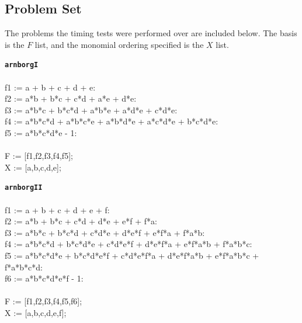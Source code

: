 \documentclass[letterpaper,12pt,titlepage,oneside,final]{book}
\newenvironment{codefont}{\footnotesize\ttfamily}{\par}
\begin{document}
\begin{appendices}
% 


\chapter{Problem Set}\label{probSet}

The problems the timing tests were performed over are included below.  The basis is the $F$ list, and the monomial ordering specified is the $X$ list.  

\singlespacing

\noindent\textbf{\texttt{arnborgI}}\\\\
\noindent\begin{codefont}
  f1 := a + b + c + d + e:\\
  f2 := a*b + b*c + c*d + a*e + d*e:\\
  f3 := a*b*c + b*c*d + a*b*e + a*d*e + c*d*e:\\
  f4 := a*b*c*d + a*b*c*e + a*b*d*e + a*c*d*e + b*c*d*e:\\
  f5 := a*b*c*d*e - 1:\\
  \\
  F := [f1,f2,f3,f4,f5];\\
  X := [a,b,c,d,e];\\
\end{codefont}

\noindent\textbf{\texttt{arnborgII}}\\\\
\noindent\begin{codefont}
  f1 := a + b + c + d + e + f:
  \\f2 := a*b + b*c + c*d + d*e + e*f + f*a:
  \\f3 := a*b*c + b*c*d + c*d*e + d*e*f  + e*f*a + f*a*b:
  \\f4 := a*b*c*d + b*c*d*e + c*d*e*f + d*e*f*a + e*f*a*b + f*a*b*c:
  \\f5 := a*b*c*d*e + b*c*d*e*f + c*d*e*f*a + d*e*f*a*b + e*f*a*b*c + f*a*b*c*d:
  \\f6 := a*b*c*d*e*f - 1:
\\
  \\F := [f1,f2,f3,f4,f5,f6];
  \\X := [a,b,c,d,e,f];\\
\end{codefont}


\end{appendices}
\end{document}
